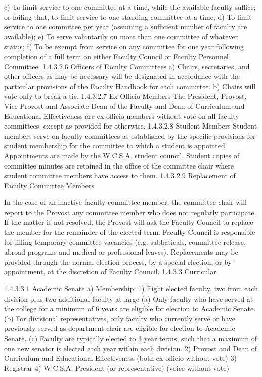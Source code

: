 \documentclass[letterpaper, 11pt]{article}
\begin{document}
c) To limit service to one committee at a time, while the available faculty suffice; or failing that, to limit service to one standing committee at a time;
d) To limit service to one committee per year (assuming a sufficient number of faculty are available);
e) To serve voluntarily on more than one committee of whatever status;
f) To be exempt from service on any committee for one year following completion of a full term on either Faculty Council or Faculty Personnel Committee.
1.4.3.2.6 Officers of Faculty Committees
a) Chairs, secretaries, and other officers as may be necessary will be designated in accordance with the particular provisions of the Faculty Handbook for each committee.
b) Chairs will vote only to break a tie.
1.4.3.2.7 Ex-Officio Members
   The President, Provost, Vice Provost and Associate Dean of the Faculty and Dean of Curriculum and Educational Effectiveness are ex-officio members without vote on all faculty committees, except as provided for otherwise.
1.4.3.2.8 Student Members
   Student members serve on faculty committees as established by the specific provisions for student membership for the committee to which a student is appointed. Appointments are made by the W.C.S.A. student council.  Student copies of committee minutes are retained in the office of the committee chair where student committee members have access to them.
1.4.3.2.9 Replacement of Faculty Committee Members

   In the case of an inactive faculty committee member, the committee chair will report to the Provost any committee member who does not regularly participate.  If the matter is not resolved, the Provost will ask the Faculty Council to replace the member for the remainder of the elected term.
   Faculty Council is responsible for filling temporary committee vacancies (e.g. sabbaticals, committee release, abroad programs and medical or professional leaves).  Replacements may be provided through the normal election process, by a special election, or by appointment, at the discretion of Faculty Council. 
1.4.3.3 Curricular
   
1.4.3.3.1 Academic Senate
a) Membership:
1) Eight elected faculty, two from each division plus two additional faculty at large
(a) Only faculty who have served at the college for a minimum of 6 years are eligible for election to Academic Senate.
(b) For divisional representatives, only faculty who currently serve or have previously served as department chair are eligible for election to Academic Senate.
(c) Faculty are typically elected to 3 year terms, such that a maximum of one new senator is elected each year within each division.
2) Provost and Dean of Curriculum and Educational Effectiveness (both ex officio without vote)
3) Registrar
4) W.C.S.A. President (or representative) (voice without vote)
\end{document}
